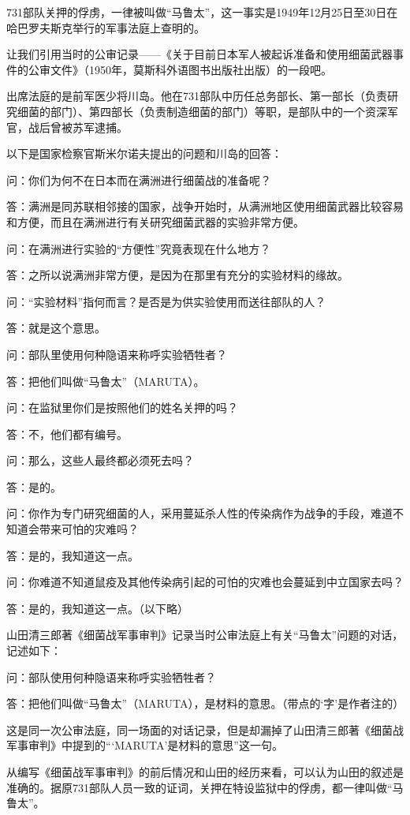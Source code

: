 \documentclass[a4paper,12pt,UTF8,twoside]{ctexbook}
\begin{document}
731部队关押的俘虏，一律被叫做“马鲁太”，这一事实是1949年12月25日至30日在哈巴罗夫斯克举行的军事法庭上查明的。

让我们引用当时的公审记录——《关于目前日本军人被起诉准备和使用细菌武器事件的公审文件》（1950年，莫斯科外语图书出版社出版）的一段吧。

出席法庭的是前军医少将川岛。他在731部队中历任总务部长、第一部长（负责研究细菌的部门）、第四部长（负责制造细菌的部门）等职，是部队中的一个资深军官，战后曾被苏军逮捕。

以下是国家检察官斯米尔诺夫提出的问题和川岛的回答：

问：你们为何不在日本而在满洲进行细菌战的准备呢？

答：满洲是同苏联相邻接的国家，战争开始时，从满洲地区使用细菌武器比较容易和方便，而且在满洲进行有关研究细菌武器的实验非常方便。

问：在满洲进行实验的“方便性”究竟表现在什么地方？

答：之所以说满洲非常方便，是因为在那里有充分的实验材料的缘故。

问：“实验材料”指何而言？是否是为供实验使用而送往部队的人？

答：就是这个意思。

问：部队里使用何种隐语来称呼实验牺牲者？

答：把他们叫做“马鲁太”（MARUTA）。

问：在监狱里你们是按照他们的姓名关押的吗？

答：不，他们都有编号。

问：那么，这些人最终都必须死去吗？

答：是的。

问：你作为专门研究细菌的人，采用蔓延杀人性的传染病作为战争的手段，难道不知道会带来可怕的灾难吗？

答：是的，我知道这一点。

问：你难道不知道鼠疫及其他传染病引起的可怕的灾难也会蔓延到中立国家去吗？

答：是的，我知道这一点。（以下略）

山田清三郎著《细菌战军事审判》记录当时公审法庭上有关“马鲁太”问题的对话，记述如下：

问：部队使用何种隐语来称呼实验牺牲者？

答：把他们叫做“马鲁太”（MARUTA），是材料的意思。（带点的‘字’是作者注的）

这是同一次公审法庭，同一场面的对话记录，但是却漏掉了山田清三郎著《细菌战军事审判》中提到的“‘MARUTA’是材料的意思”这一句。

从编写《细菌战军事审判》的前后情况和山田的经历来看，可以认为山田的叙述是准确的。据原731部队人员一致的证词，关押在特设监狱中的俘虏，都一律叫做“马鲁太”。
\end{document}
